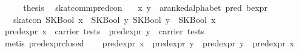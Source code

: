 \begin{isabellebody}
\ \ \isamarkupfalse%
\ \isamarkupfalse%
\ {}thesis\ \isamarkupfalse%
\isanewline
{}\isamarkupfalse%
%
\endisatagproof
{\isafoldproof}%
%
\isadelimproof
\isanewline
%
\endisadelimproof
\isanewline
{}\isamarkupfalse%
\ skat{}comm{}pred{}con{}\isanewline
\ \ \ x\ y\ {}{}\ {}{}a{}{}ranked{}alphabet\ pred\ bexpr{}\isanewline
\ \ \ {}skat{}con\ {}SKBool\ x\ {}{}{}\ SKBool\ y{}\ {}SKBool\ y\ {}{}{}\ SKBool\ x{}{}\isanewline
%
\isadelimproof
%
\endisadelimproof
%
\isatagproof
{}\isamarkupfalse%
\ {}\isanewline
\ \ \isamarkupfalse%
\ {}pred{}expr\ x\ {}\ carrier\ tests{}\ \ {}pred{}expr\ y\ {}\ carrier\ tests{}\isanewline
\ \ \ \ \isamarkupfalse%
\ {}metis\ pred{}expr{}closed{}{}\isanewline
\ \ \isamarkupfalse%
\ {}pred{}expr\ x\ {}\ pred{}expr\ y\ {}\ pred{}expr\ y\ {}\ pred{}expr\ x{}\isanewline

\end{isabellebody}
